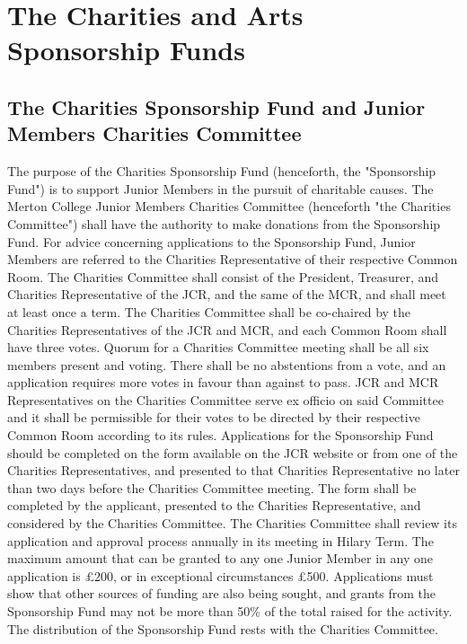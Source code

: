 \chapter{The Charities and Arts Sponsorship Funds} \label{App:CharitiesArtsFunds}
\section{The Charities Sponsorship Fund and Junior Members Charities Committee} \label{AppSec:CharitiesFunc}
\appnpara The purpose of the Charities Sponsorship Fund (henceforth, the "Sponsorship Fund") is to support Junior Members in the pursuit of charitable causes.
\appnpara The Merton College Junior Members Charities Committee (henceforth "the Charities Committee") shall have the authority to make donations from the Sponsorship Fund. For advice concerning applications to the Sponsorship Fund, Junior Members are referred to the Charities Representative of their respective Common Room.
\appnpara The Charities Committee shall consist of the President, Treasurer, and Charities Representative of the JCR, and the same of the MCR, and shall meet at least once a term. The Charities Committee shall be co-chaired by the Charities Representatives of the JCR and MCR, and each Common Room shall have three votes. Quorum for a Charities Committee meeting shall be all six members present and voting. There shall be no abstentions from a vote, and an application requires more votes in favour than against to pass. JCR and MCR Representatives on the Charities Committee serve ex officio on said Committee and it shall be permissible for their votes to be directed by their respective Common Room according to its rules.
\appnpara Applications for the Sponsorship Fund should be completed on the form available on the JCR website or from one of the Charities Representatives, and presented to that Charities Representative no later than two days before the Charities Committee meeting. The form shall be completed by the applicant, presented to the Charities Representative, and considered by the Charities Committee. The Charities Committee shall review its application and approval process annually in its meeting in Hilary Term.
\appnpara The maximum amount that can be granted to any one Junior Member in any one application is £200, or in exceptional circumstances £500. Applications must show that other sources of funding are also being sought, and grants from the Sponsorship Fund may not be more than 50\% of the total raised for the activity. The distribution of the Sponsorship Fund rests with the Charities Committee.
